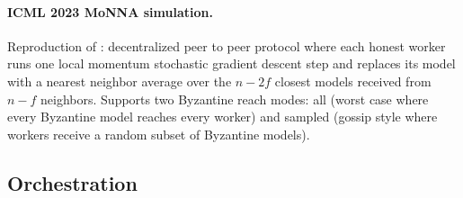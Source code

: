 \documentclass[twoside,11pt]{article}
\begin{document}
\paragraph{ICML 2023 MoNNA simulation.}
Reproduction of \citet{farhadkhani2023monna}: decentralized peer to peer protocol where each honest worker runs one local momentum stochastic gradient descent step and replaces its model with a nearest neighbor average over the $n - 2f$ closest models received from $n - f$ neighbors. Supports two Byzantine reach modes: all (worst case where every Byzantine model reaches every worker) and sampled (gossip style where workers receive a random subset of Byzantine models).

\subsection{Orchestration}

\end{document}
